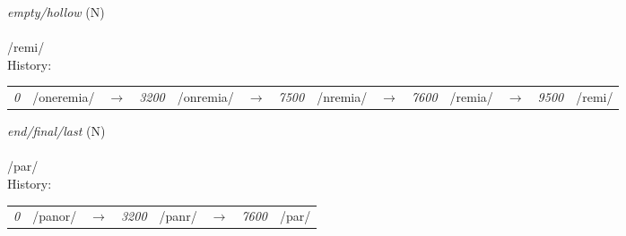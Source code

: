 \vspace{15pt}
\begin{nopagebreak}
 \textit{empty/hollow} (N)\\
\\
\noindent /r{\textprimstress}emi/\\


\noindent History:

\vspace{-0pt}
\hspace{40pt}
\begin{tabular}{ccc}
\textit{0} & /oneremia/&$\rightarrow$ & \textit{3200} & /onremia/&$\rightarrow$ & \textit{7500} & /nremia/&$\rightarrow$ & \textit{7600} & /remia/&$\rightarrow$ & \textit{9500} & /remi/& \\
\end{tabular}

\vspace{20pt}\hline

\end{nopagebreak}
\filbreak



\vspace{15pt}
\begin{nopagebreak}
 \textit{end/final/last} (N)\\
\\
\noindent /p{\textprimstress}ar/\\


\noindent History:

\vspace{-0pt}
\hspace{40pt}
\begin{tabular}{ccc}
\textit{0} & /panor/&$\rightarrow$ & \textit{3200} & /panr/&$\rightarrow$ & \textit{7600} & /par/& \\
\end{tabular}

\vspace{20pt}\hline

\end{nopagebreak}
\filbreak



